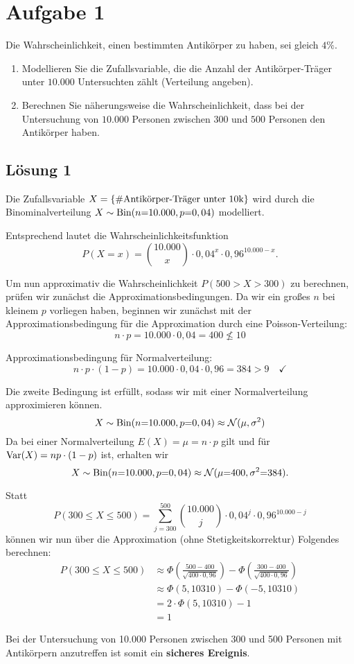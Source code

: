 \documentclass[main.tex]{subfiles}
\begin{document}
\section{Aufgabe 1}
Die Wahrscheinlichkeit, einen bestimmten Antikörper zu haben, sei gleich $4\%$.
\begin{enumerate}
\item Modellieren Sie die Zufallsvariable, die die Anzahl der Antikörper-Träger unter $10.000$ Untersuchten zählt (Verteilung angeben).
\item Berechnen Sie näherungsweise die Wahrscheinlichkeit, dass bei der Untersuchung von $10.000$ Personen zwischen $300$ und $500$ Personen den Antikörper haben.
\end{enumerate}

\subsection{Lösung 1}
Die Zufallsvariable $X = \{\#\text{Antikörper-Träger unter 10k}\}$ wird durch die Binominalverteilung $X\sim\operatorname{Bin}(n{=}10.000, p{=}0,04)$ modelliert. 

Entsprechend lautet die Wahrscheinlichkeitsfunktion
$$
    P(X{=}x) = \binom{10.000}{x} \cdot 0,04^{x} \cdot 0,96^{10.000-x}.
$$

Um nun approximativ die Wahrscheinlichkeit $P(500{>}X{>}300)$ zu berechnen, prüfen wir zunächst die Approximationsbedingungen.
Da wir ein großes $n$ bei kleinem $p$ vorliegen haben, beginnen wir zunächst mit der Approximationsbedingung für die Approximation durch eine Poisson-Verteilung:
$$
    n\cdot p = 10.000 \cdot 0,04 = 400 \not\leq 10
$$

Approximationsbedingung für Normalverteilung:
$$
    n\cdot p\cdot (1-p) = 10.000\cdot 0,04 \cdot 0,96 = 384 > 9 \quad \checkmark
$$

Die zweite Bedingung ist erfüllt, sodass wir mit einer Normalverteilung approximieren können.
$$
    X\sim\operatorname{Bin}(n{=}10.000, p{=}0,04) \approx \mathcal{N}(\mu, \sigma^2)
$$
Da bei einer Normalverteilung $E(X) = \mu = n\cdot p$ gilt und für $\operatorname{Var}(X)=np\cdot (1-p)$ ist, erhalten wir 
$$
    X\sim\operatorname{Bin}(n{=}10.000, p{=}0,04) \approx \mathcal{N}(\mu {=} 400, \sigma^2 {=} 384).
$$

Statt $$
    P(300 {\leq} X {\leq} 500) = \sum_{j=300}^{500} \binom{10.000}{j} \cdot 0,04^j \cdot 0,96^{10.000 - j}
$$
können wir nun über die Approximation (ohne Stetigkeitskorrektur) Folgendes berechnen:
$$\begin{aligned}
    P(300 {\leq} X {\leq} 500) &\approx 
        \Phi \left(\frac{500-400}{\sqrt{400\cdot 0,96}}\right) -
        \Phi \left(\frac{300-400}{\sqrt{400\cdot 0,96}}\right) \\
        &\approx \Phi(5,10310) - \Phi(-5,10310) \\
        &= 2\cdot \Phi(5,10310) - 1 \\
        &= 1
\end{aligned}$$

Bei der Untersuchung von 10.000 Personen zwischen 300 und 500 Personen mit Antikörpern anzutreffen ist somit ein \textbf{sicheres Ereignis}.
\end{document}
